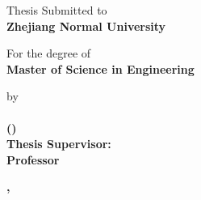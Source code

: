 \clearpage
\begin{center}
    \MakeUppercase{\TitleEng}
\end{center}

\vspace{60pt}

\begin{center}

    Thesis Submitted to\\[10pt]
    {\bfseries Zhejiang Normal University}

    \vspace{40pt}

    For the degree of\\[10pt]
    {\bfseries Master of Science in Engineering}

    \vspace{40pt}

    by\\[10pt]
    {\bfseries
        \StudentNameEng\\[10pt]
        (\MajorEng)\\[10pt]
        Thesis Supervisor:\\[10pt]
        Professor \AdvisorEng
    }

    \vspace{40pt}

    {\bfseries \SubmitMonEng, \SubmitYear}

\end{center}
